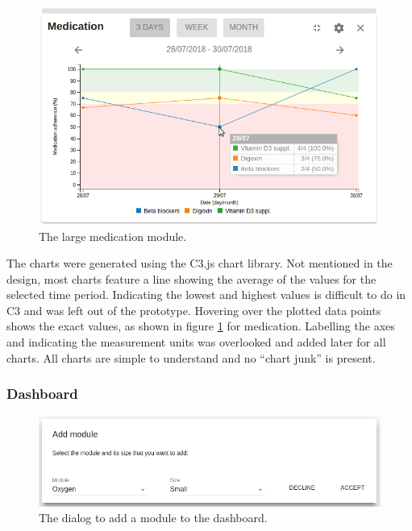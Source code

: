         \begin{figure}[!t]
            \centering
            \includegraphics[width=1\textwidth]{screenshots/med_large}
            \caption{The large medication module.}\label{fig:screen_med_large}
        \end{figure}

        The charts were generated using the C3.js chart library. Not mentioned in the design, most charts feature a line showing the average of the values for the selected time period. Indicating the lowest and highest values is difficult to do in C3 and was left out of the prototype. Hovering over the plotted data points shows the exact values, as shown in figure \ref{fig:screen_med_large} for medication. Labelling the axes and indicating the measurement units was overlooked and added later for all charts. All charts are simple to understand and no ``chart junk'' is present.

        \subsubsection{Dashboard}

        \begin{figure}[!t]
            \centering
            \includegraphics[width=1\textwidth]{screenshots/add_module}
            \caption{The dialog to add a module to the dashboard.}\label{fig:screen_add_module}
        \end{figure}

